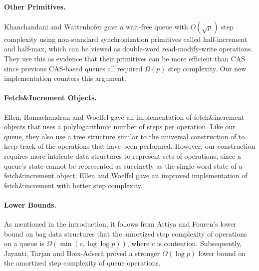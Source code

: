 
\paragraph{Other Primitives.}
Khanchandani and Wattenhofer \cite{KW18} gave a wait-free queue 
with $O(\sqrt{p})$ step complexity using non-standard synchronization primitives
called half-increment and half-max, which can be viewed as %
double-word read-modify-write operations.
They use this as evidence that their primitives can be more efficient than CAS
since previous CAS-based queues all required $\Omega(p)$ step complexity.
Our new implementation counters this argument.

\paragraph{Fetch\&Increment Objects.}
Ellen, Ramachandran and Woelfel \cite{ERW12} gave an implementation of 
fetch\&increment objects that uses a polylogarithmic number of steps per operation.
Like our queue, they also use a tree structure similar to the universal construction of 
\cite{DBLP:conf/stoc/AfekDT95} to keep track of the operations
that have been performed.
However, our construction requires more intricate
data structures to represent sets of operations, since a queue's state cannot be represented as succinctly
as the single-word state of a fetch\&increment object.
Ellen and Woelfel \cite{10.1007/978-3-642-41527-2_20} gave an improved implementation of fetch\&increment with better step complexity.

\paragraph{Lower Bounds.}
As mentioned in the introduction, it follows from Attiya and Fouren's lower bound on bag data structures
\cite{DBLP:conf/opodis/AttiyaF17} that the
amortized step complexity of operations on a queue is $\Omega(\min(c,\log\log p))$, where $c$ is contention.
Subsequently, Jayanti, Tarjan and Boix-Adser\`{a} \cite{JTB19} proved a stronger $\Omega(\log p)$ lower bound on
the amortized step complexity of queue operations.


